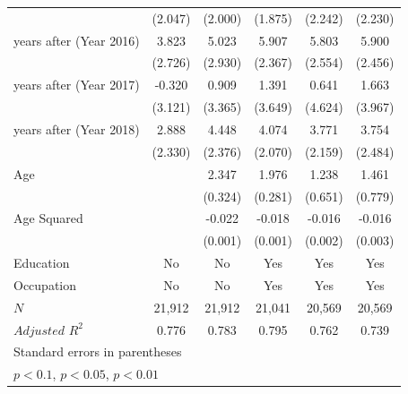 \documentclass[serif, aspectratio=169]{beamer}
\begin{document}
\begin{frame}
\begin{table}[htbp]
\begin{tabular}{@{\extracolsep{5pt}}lccccc}
            &     (2.047)         &     (2.000)         &     (1.875)         &     (2.242)         &     (2.230)         \\
\addlinespace
5 years after (Year 2016)&       3.823         &       5.023\sym{*}  &       5.907\sym{**} &       5.803\sym{**} &       5.900\sym{**} \\
            &     (2.726)         &     (2.930)         &     (2.367)         &     (2.554)         &     (2.456)         \\
\addlinespace
6 years after (Year 2017)&      -0.320         &       0.909         &       1.391         &       0.641         &       1.663         \\
            &     (3.121)         &     (3.365)         &     (3.649)         &     (4.624)         &     (3.967)         \\
\addlinespace
7 years after (Year 2018)&       2.888         &       4.448\sym{*}  &       4.074\sym{*}  &       3.771\sym{*}  &       3.754         \\
            &     (2.330)         &     (2.376)         &     (2.070)         &     (2.159)         &     (2.484)         \\
\addlinespace
Age         &                     &       2.347\sym{***}&       1.976\sym{***}&       1.238\sym{*}  &       1.461\sym{*}  \\
            &                     &     (0.324)         &     (0.281)         &     (0.651)         &     (0.779)         \\
\addlinespace
Age Squared &                     &      -0.022\sym{***}&      -0.018\sym{***}&      -0.016\sym{***}&      -0.016\sym{***}\\
            &                     &     (0.001)         &     (0.001)         &     (0.002)         &     (0.003)         \\
\midrule
Education   &          No         &          No         &         Yes         &         Yes         &         Yes         \\
Occupation  &          No         &          No         &         Yes         &         Yes         &         Yes         \\
$\textit{N}$&      21,912         &      21,912         &      21,041         &      20,569         &      20,569         \\
$\textit{Adjusted R}^2$&       0.776         &       0.783         &       0.795         &       0.762         &       0.739         \\
\bottomrule
\multicolumn{6}{l}{\footnotesize Standard errors in parentheses}\\
\multicolumn{6}{l}{\footnotesize \sym{*} \(p<0.1\), \sym{**} \(p<0.05\), \sym{***} \(p<0.01\)}\\

\end{tabular}

\label{table:Monthly_Income}

\end{table}

\end{frame}
\end{document}
